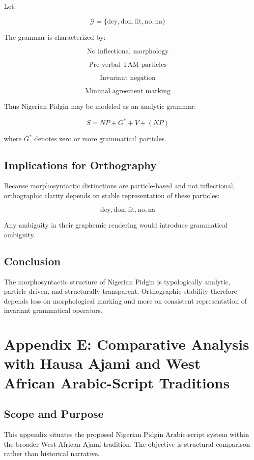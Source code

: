 \documentclass[12pt]{article}
\begin{document}
Let:

\[
\mathcal{G} = \{\text{dey}, \text{don}, \text{fit}, \text{no}, \text{na}\}
\]

The grammar is characterized by:

\[
\text{No inflectional morphology}
\]

\[
\text{Pre-verbal TAM particles}
\]

\[
\text{Invariant negation}
\]

\[
\text{Minimal agreement marking}
\]

Thus Nigerian Pidgin may be modeled as an analytic grammar:

\[
S = NP + G^* + V + (NP)
\]

where \( G^* \) denotes zero or more grammatical particles.

\subsection{Implications for Orthography}

Because morphosyntactic distinctions are particle-based and not inflectional, orthographic clarity depends on stable representation of these particles:

\[
\text{dey}, \text{don}, \text{fit}, \text{no}, \text{na}
\]

Any ambiguity in their graphemic rendering would introduce grammatical ambiguity.

\subsection{Conclusion}

The morphosyntactic structure of Nigerian Pidgin is typologically analytic, particle-driven, and structurally transparent. Orthographic stability therefore depends less on morphological marking and more on consistent representation of invariant grammatical operators.

\section{Appendix E: Comparative Analysis with Hausa Ajami and West African Arabic-Script Traditions}

\subsection{Scope and Purpose}

This appendix situates the proposed Nigerian Pidgin Arabic-script system within the broader West African Ajami tradition. The objective is structural comparison rather than historical narrative.
\end{document}
